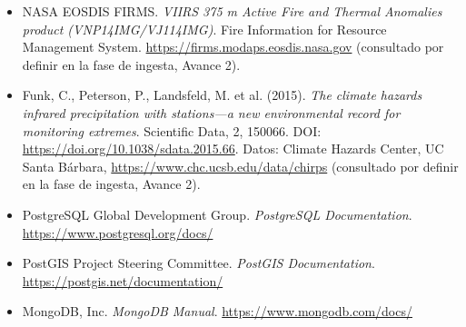 \documentclass[11pt,a4paper]{article}
\begin{document}
\begin{itemize}
    \item NASA EOSDIS FIRMS. \textit{VIIRS 375 m Active Fire and Thermal Anomalies product (VNP14IMG/VJ114IMG)}. Fire Information for Resource Management System. \url{https://firms.modaps.eosdis.nasa.gov} (consultado por definir en la fase de ingesta, Avance 2).
    \item Funk, C., Peterson, P., Landsfeld, M. et al. (2015). \textit{The climate hazards infrared precipitation with stations---a new environmental record for monitoring extremes}. Scientific Data, 2, 150066. DOI: \url{https://doi.org/10.1038/sdata.2015.66}. Datos: Climate Hazards Center, UC Santa B\'arbara, \url{https://www.chc.ucsb.edu/data/chirps} (consultado por definir en la fase de ingesta, Avance 2).
    \item PostgreSQL Global Development Group. \textit{PostgreSQL Documentation}. \url{https://www.postgresql.org/docs/}
    \item PostGIS Project Steering Committee. \textit{PostGIS Documentation}. \url{https://postgis.net/documentation/}
    \item MongoDB, Inc. \textit{MongoDB Manual}. \url{https://www.mongodb.com/docs/}
\end{itemize}
\end{document}
